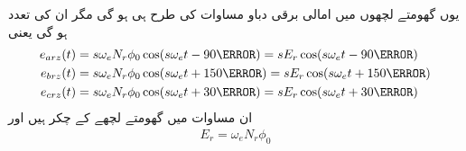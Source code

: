 یوں گھومتے لچھوں میں امالی برقی دباو مساوات   کی طرح ہی ہو گی مگر ان کی تعدد  ہو گی یعنی
\begin{gather}
\begin{aligned}\label{مساوات_امالی_گھومتا_حصہ_تین_دور_سائن_نما_برقی_دباو}
e_{arz}(t)&=s \omega_e N_r \phi_0 \cos (s \omega_e t -90\degree)=s E_r \cos (s \omega_e t -90\degree)\\
e_{brz}(t)&=s \omega_e N_r \phi_0 \cos (s \omega_e t +150\degree)= s E_r \cos (s \omega_e t +150\degree)\\
e_{crz}(t)&=s \omega_e N_r \phi_0 \cos (s \omega_e t +30\degree)= s E_r \cos (s \omega_e t +30\degree)
\end{aligned}
\end{gather}
ان مساوات میں   گھومتے لچھے کے چکر ہیں اور
\begin{align}
E_r=\omega_e N_r \phi_0
\end{align}

